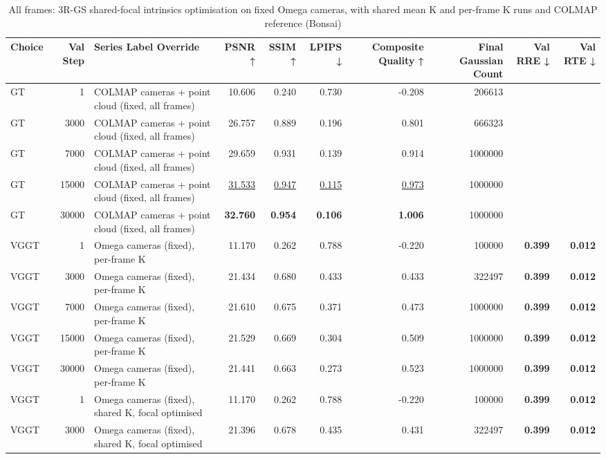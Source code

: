 \begin{table}[H]
\caption{\ifdefined\customcaption \customcaption \else All frames: 3R-GS shared-focal intrinsics optimisation on fixed Omega cameras, with shared mean K and per-frame K runs and COLMAP reference (Bonsai) \fi}
\label{tab:123_omega_epi_intropt_omega_bonsai}
\centering
\tiny
\begin{tabular}{lrlrrrrrrr}
\toprule
Choice & Val Step & Series Label Override & PSNR ↑ & SSIM ↑ & LPIPS ↓ & Composite Quality ↑ & Final Gaussian Count & Val RRE ↓ & Val RTE ↓ \\
\midrule
GT & 1 & COLMAP cameras + point cloud (fixed, all frames) & 10.606 & 0.240 & 0.730 & -0.208 & 206613 &  &  \\
GT & 3000 & COLMAP cameras + point cloud (fixed, all frames) & 26.757 & 0.889 & 0.196 & 0.801 & 666323 &  &  \\
GT & 7000 & COLMAP cameras + point cloud (fixed, all frames) & 29.659 & 0.931 & 0.139 & 0.914 & 1000000 &  &  \\
GT & 15000 & COLMAP cameras + point cloud (fixed, all frames) & \underline{31.533} & \underline{0.947} & \underline{0.115} & \underline{0.973} & 1000000 &  &  \\
GT & 30000 & COLMAP cameras + point cloud (fixed, all frames) & \textbf{32.760} & \textbf{0.954} & \textbf{0.106} & \textbf{1.006} & 1000000 &  &  \\
VGGT & 1 & Omega cameras (fixed), per-frame K & 11.170 & 0.262 & 0.788 & -0.220 & 100000 & \textbf{0.399} & \textbf{0.012} \\
VGGT & 3000 & Omega cameras (fixed), per-frame K & 21.434 & 0.680 & 0.433 & 0.433 & 322497 & \textbf{0.399} & \textbf{0.012} \\
VGGT & 7000 & Omega cameras (fixed), per-frame K & 21.610 & 0.675 & 0.371 & 0.473 & 1000000 & \textbf{0.399} & \textbf{0.012} \\
VGGT & 15000 & Omega cameras (fixed), per-frame K & 21.529 & 0.669 & 0.304 & 0.509 & 1000000 & \textbf{0.399} & \textbf{0.012} \\
VGGT & 30000 & Omega cameras (fixed), per-frame K & 21.441 & 0.663 & 0.273 & 0.523 & 1000000 & \textbf{0.399} & \textbf{0.012} \\
VGGT & 1 & Omega cameras (fixed), shared K, focal optimised & 11.170 & 0.262 & 0.788 & -0.220 & 100000 & \textbf{0.399} & \textbf{0.012} \\
VGGT & 3000 & Omega cameras (fixed), shared K, focal optimised & 21.396 & 0.678 & 0.435 & 0.431 & 322497 & \textbf{0.399} & \textbf{0.012} \\

\end{tabular}
\end{table}
